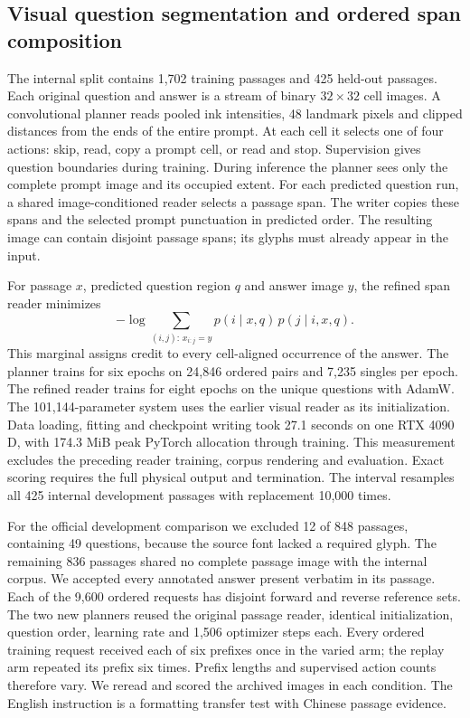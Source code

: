 \subsection*{Visual question segmentation and ordered span composition}
The internal split contains 1,702 training passages and 425 held-out passages. Each original question and answer is a stream of binary $32\times32$ cell images. A convolutional planner reads pooled ink intensities, 48 landmark pixels and clipped distances from the ends of the entire prompt. At each cell it selects one of four actions: skip, read, copy a prompt cell, or read and stop. Supervision gives question boundaries during training. During inference the planner sees only the complete prompt image and its occupied extent. For each predicted question run, a shared image-conditioned reader selects a passage span. The writer copies these spans and the selected prompt punctuation in predicted order. The resulting image can contain disjoint passage spans; its glyphs must already appear in the input.

For passage $x$, predicted question region $q$ and answer image $y$, the refined span reader minimizes
\[
-\log \sum_{(i,j):\,x_{i:j}=y} p(i\mid x,q)\,p(j\mid i,x,q).
\]
This marginal assigns credit to every cell-aligned occurrence of the answer. The planner trains for six epochs on 24,846 ordered pairs and 7,235 singles per epoch. The refined reader trains for eight epochs on the unique questions with AdamW. The 101,144-parameter system uses the earlier visual reader as its initialization. Data loading, fitting and checkpoint writing took 27.1 seconds on one RTX 4090 D, with 174.3 MiB peak PyTorch allocation through training. This measurement excludes the preceding reader training, corpus rendering and evaluation. Exact scoring requires the full physical output and termination. The interval resamples all 425 internal development passages with replacement 10,000 times.

For the official development comparison we excluded 12 of 848 passages, containing 49 questions, because the source font lacked a required glyph. The remaining 836 passages shared no complete passage image with the internal corpus. We accepted every annotated answer present verbatim in its passage. Each of the 9,600 ordered requests has disjoint forward and reverse reference sets. The two new planners reused the original passage reader, identical initialization, question order, learning rate and 1,506 optimizer steps each. Every ordered training request received each of six prefixes once in the varied arm; the replay arm repeated its prefix six times. Prefix lengths and supervised action counts therefore vary. We reread and scored the archived images in each condition. The English instruction is a formatting transfer test with Chinese passage evidence.

